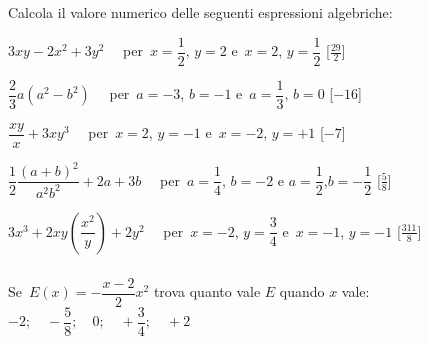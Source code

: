 
\begin{esercizio}[\Ast]
\label{ese:8.23}
Calcola il valore numerico delle seguenti espressioni algebriche:
 \begin{enumeratea}
\spazielenx
 \item $3xy-2x^{2}+3y^{2}\quad$ 
 per~$x=\dfrac{1}{2}$, $y=2$ e~$x=2$, $y=\dfrac{1}{2}$ \hfill[$\frac{29}{2}$]
 \item $\dfrac{2}{3}a\left(a^2-b^2 \right) \quad$ 
 per~$a=-3$, $b=-1$ e~$a=\dfrac{1}{3}$, $b=0$ \hfill[$-16$]
 \item $\dfrac{xy}{x}+3xy^{3}\quad$ 
 per~$x=2$, $y=-1$ e~$x=-2$, $y=+1$ \hfill[$-7$]
 \item $\dfrac{1}{2}\dfrac{(a+b)^{2}}{a^{2}b^{2}}+2a+3b\quad$ 
 per~$a=\dfrac{1}{4}$, $b=-2$ e $a=\dfrac{1}{2}$,$b=-{\dfrac{1}{2}}$ 
\hfill[$\frac{5}{8}$]
 \item $3x^{3}+2xy\left(\dfrac{x^{2}}{y}\right)+2y^{2}\quad$ 
 per~$x=-2$, $y=\dfrac{3}{4}$ e~$x=-1$, $y=-1$ \hfill[$\frac{311}{8}$]
 \end{enumeratea}
\end{esercizio}


\subsubsection*{}

\begin{esercizio}
 \label{ese:8.25}
Se~$E(x)=-{\dfrac{x-2}{2}x^{2}}$ trova quanto vale $E$ quando 
$x$ vale: 
$ -2; \quad -{\dfrac{5}{8}}; \quad 0; \quad +\dfrac{3}{4}; \quad +2$\\
\end{esercizio}

